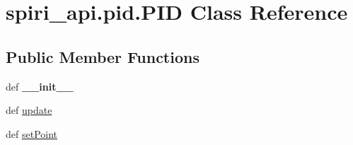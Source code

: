 \hypertarget{classspiri__api_1_1pid_1_1_p_i_d}{\section{spiri\-\_\-api.\-pid.\-P\-I\-D \-Class \-Reference}
\label{classspiri__api_1_1pid_1_1_p_i_d}
}
\subsection*{\-Public \-Member \-Functions}
\begin{DoxyCompactItemize}
\item 
\hypertarget{classspiri__api_1_1pid_1_1_p_i_d_a1caafcce2de3920b8e3d7a3c819f30a7}{def {\bfseries \-\_\-\-\_\-init\-\_\-\-\_\-}}\label{classspiri__api_1_1pid_1_1_p_i_d_a1caafcce2de3920b8e3d7a3c819f30a7}

\item 
def \hyperlink{classspiri__api_1_1pid_1_1_p_i_d_a7e0273463b18d2f0ddef7f91c8457ea9}{update}
\item 
def \hyperlink{classspiri__api_1_1pid_1_1_p_i_d_ae1ae6a13b63865567c271c0eb2118fa2}{set\-Point}
\end{DoxyCompactItemize}
